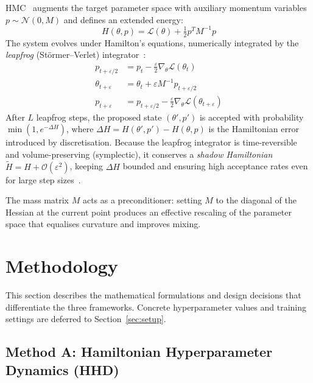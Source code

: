 \documentclass[12pt,a4paper]{article}
\begin{document}
HMC~\cite{duane1987,neal2011} augments the target parameter space with
auxiliary momentum variables $p \sim \mathcal{N}(0, M)$ and defines
an extended energy:
\begin{equation}
H(\theta,p) = \mathcal{L}(\theta) + \tfrac{1}{2}p^TM^{-1}p
\label{eq:hmc}
\end{equation}
The system evolves under Hamilton's equations, numerically integrated
by the \emph{leapfrog} (St\"ormer--Verlet) integrator~\cite{leimkuhler2004}:
\begin{align}
p_{t+\varepsilon/2} &= p_t - \tfrac{\varepsilon}{2}\nabla_\theta\mathcal{L}(\theta_t)
\label{eq:lf1}\\
\theta_{t+\varepsilon} &= \theta_t + \varepsilon M^{-1}p_{t+\varepsilon/2}
\label{eq:lf2}\\
p_{t+\varepsilon}   &= p_{t+\varepsilon/2}
  - \tfrac{\varepsilon}{2}\nabla_\theta\mathcal{L}(\theta_{t+\varepsilon})
\label{eq:lf3}
\end{align}
After $L$ leapfrog steps, the proposed state $(\theta', p')$ is
accepted with probability $\min(1, e^{-\Delta H})$, where
$\Delta H = H(\theta', p') - H(\theta, p)$ is the Hamiltonian error
introduced by discretisation.  Because the leapfrog integrator is
time-reversible and volume-preserving (symplectic), it conserves a
\emph{shadow Hamiltonian} $\tilde{H} = H + \mathcal{O}(\varepsilon^2)$,
keeping $\Delta H$ bounded and ensuring high acceptance rates even for
large step sizes~\cite{hairer2006,betancourt2017}.

The mass matrix $M$ acts as a preconditioner: setting $M$ to the
diagonal of the Hessian at the current point produces an effective
rescaling of the parameter space that equalises curvature and improves
mixing.

\newpage


\section{Methodology}

This section describes the mathematical formulations and design
decisions that differentiate the three frameworks.  Concrete
hyperparameter values and training settings are deferred to
Section~\ref{sec:setup}.

\subsection{Method A: Hamiltonian Hyperparameter Dynamics (HHD)}
\end{document}
